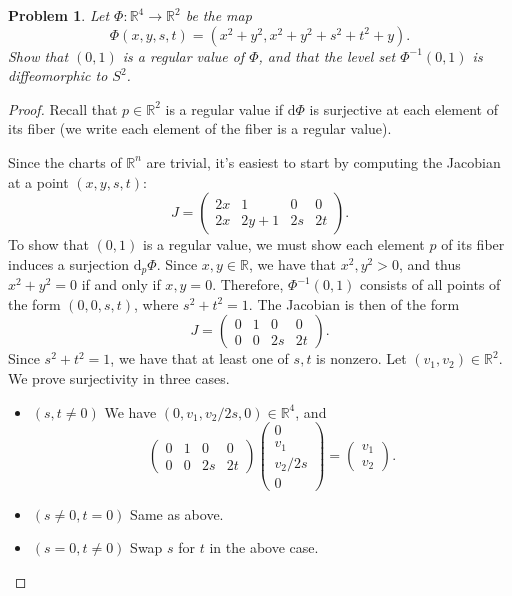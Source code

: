 \documentclass[11pt, letterpaper]{article}
\theoremstyle{plain}
\newtheorem{problem}{Problem}[section]
\begin{document}
\begin{problem}
	Let $\Phi : \mathbb{R} ^4 \to \mathbb{R} ^2$ be the map
	\[
		\Phi (x,y,s,t)=\left( x^2+y^2,x^2+y^2+s^2+t^2+y \right) 
	.\]
	Show that $(0,1)$ is a regular value of $\Phi $, and that the level set $\Phi ^{-1} (0,1)$ is diffeomorphic to $S^2$.
\end{problem}
\begin{proof}
	Recall that $p\in\mathbb{R} ^2$ is a regular value if $\mathrm{d} \Phi $ is surjective at each element of its fiber (we write each element of the fiber is a regular value).

	Since the charts of $\mathbb{R} ^n$ are trivial, it's easiest to start by computing the Jacobian at a point $(x,y,s,t)$:
	\[
		J=\begin{pmatrix}
		2x & 1 & 0 & 0 \\
		2x & 2y+1 & 2s & 2t
		\end{pmatrix}
	.\]
	To show that $(0,1)$ is a regular value, we must show each element $p$ of its fiber induces a surjection $\mathrm{d}_p\Phi $. Since $x,y\in\mathbb{R} $, we have that $x^2,y^2>0$, and thus $x^2+y^2=0$ if and only if $x,y=0$. Therefore, $\Phi ^{-1} (0,1)$ consists of all points of the form $(0,0,s,t)$, where $s^2+t^2=1$. The Jacobian is then of the form
	\[
		J=\begin{pmatrix}
		0 & 1 & 0 & 0 \\
		0 & 0 & 2s & 2t
		\end{pmatrix}
	.\]
	Since $s^2+t^2=1$, we have that at least one of $s,t$ is nonzero. Let $(v_1,v_2)\in\mathbb{R} ^2$. We prove surjectivity in three cases.
	\begin{itemize}
		\item $(s,t\neq 0)$ We have $(0,v_1,v_2/2s,0)\in\mathbb{R} ^4$, and
			\[
				\begin{pmatrix}
				0 & 1 & 0 & 0 \\
				0 & 0 & 2s & 2t
				\end{pmatrix}\begin{pmatrix}
				0 \\
				v_1 \\
				v_2/2s \\
				0
				\end{pmatrix}=\begin{pmatrix}
				v_1 \\
				v_2
				\end{pmatrix}
			.\]
		\item $(s\neq 0,t=0)$ Same as above.
		\item $(s=0,t\neq 0)$ Swap $s$ for $t$ in the above case.

\end{itemize}
\end{proof}
\end{document}
